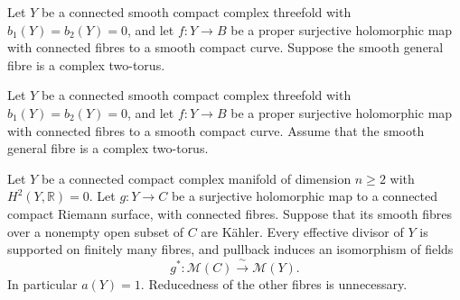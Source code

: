 Let $Y$ be a connected smooth compact complex threefold with
$b_1(Y)=b_2(Y)=0$, and let $f:Y\to B$ be a proper surjective
holomorphic map with connected fibres to a smooth compact curve.
Suppose the smooth general fibre is a complex two-torus. 

Let $Y$ be a connected smooth compact complex threefold with
$b_1(Y)=b_2(Y)=0$, and let $f:Y\to B$ be a proper surjective
holomorphic map with connected fibres to a smooth compact curve.
Assume that the smooth general fibre is a complex two-torus.


\begin{proposition}\hypertarget{tag-01GG}{}\label{cdp:st:E1}


Let $Y$ be a connected compact complex manifold of dimension $n\geq2$
with $H^2(Y,\mathbb R)=0$. Let $g:Y\to C$ be a surjective holomorphic
map to a connected compact Riemann surface, with connected fibres.
Suppose that its smooth fibres over a nonempty open subset of $C$ are
K\"ahler. Every effective divisor of $Y$ is supported on finitely many
fibres, and pullback induces an isomorphism of fields
\[
 g^*: \mathcal M(C)\xrightarrow{\ \sim\ }\mathcal M(Y).
\]
In particular $a(Y)=1$. Reducedness of the other fibres is unnecessary.
\end{proposition}
